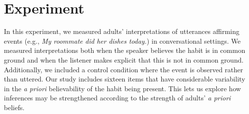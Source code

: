 \documentclass[10pt,letterpaper]{article}
\begin{document}
\section{Experiment}

In this experiment, we measured adults' interpretations of utterances affirming events (e.g., \emph{My roommate did her dishes today.}) in conversational settings.  
We measured interpretations both when the speaker believes the habit is in common ground and when the listener makes explicit that this is not in common ground.
Additionally, we included a control condition where the event is observed rather than uttered. 
Our study includes sixteen items that have considerable variability in the \emph{a priori} believability of the habit being present. 
This lets us explore how inferences may be strengthened according to the strength of adults' \emph{a priori} beliefs.

\end{document}
